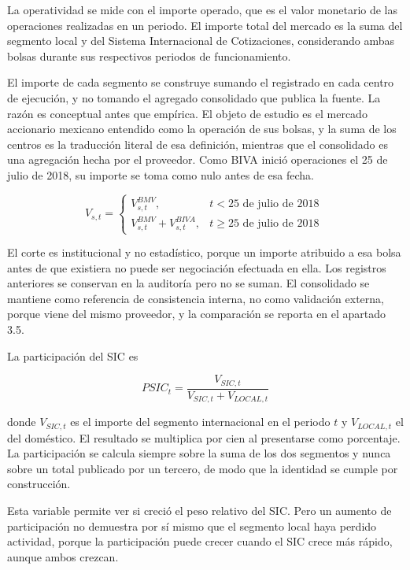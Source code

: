 
La operatividad se mide con el importe operado, que es el valor monetario de las operaciones realizadas en un periodo. El importe total del mercado es la suma del segmento local y del Sistema Internacional de Cotizaciones, considerando ambas bolsas durante sus respectivos periodos de funcionamiento.

El importe de cada segmento se construye sumando el registrado en cada centro de ejecución, y no tomando el agregado consolidado que publica la fuente. La razón es conceptual antes que empírica. El objeto de estudio es el mercado accionario mexicano entendido como la operación de sus bolsas, y la suma de los centros es la traducción literal de esa definición, mientras que el consolidado es una agregación hecha por el proveedor. Como BIVA inició operaciones el 25 de julio de 2018, su importe se toma como nulo antes de esa fecha.

\[V_{s,t} = \left\{ \begin{matrix}
V_{s,t}^{BMV}, & t < \text{25 de julio de 2018} \\
V_{s,t}^{BMV} + V_{s,t}^{BIVA}, & t \geq \text{25 de julio de 2018}
\end{matrix} \right.\ \]

El corte es institucional y no estadístico, porque un importe atribuido a esa bolsa antes de que existiera no puede ser negociación efectuada en ella. Los registros anteriores se conservan en la auditoría pero no se suman. El consolidado se mantiene como referencia de consistencia interna, no como validación externa, porque viene del mismo proveedor, y la comparación se reporta en el apartado 3.5.

La participación del SIC es

\begin{equation}PSIC_{t} = \frac{V_{SIC,t}}{V_{SIC,t} + V_{LOCAL,t}}\tag{1}\end{equation}

donde $V_{SIC,t}$ es el importe del segmento internacional en el periodo $t$ y $V_{LOCAL,t}$ el del doméstico. El resultado se multiplica por cien al presentarse como porcentaje. La participación se calcula siempre sobre la suma de los dos segmentos y nunca sobre un total publicado por un tercero, de modo que la identidad se cumple por construcción.

Esta variable permite ver si creció el peso relativo del SIC. Pero un aumento de participación no demuestra por sí mismo que el segmento local haya perdido actividad, porque la participación puede crecer cuando el SIC crece más rápido, aunque ambos crezcan.

